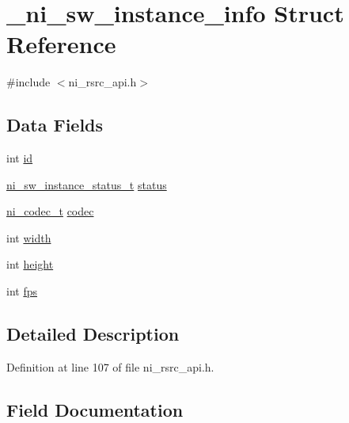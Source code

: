 \hypertarget{struct__ni__sw__instance__info}{}\section{\+\_\+ni\+\_\+sw\+\_\+instance\+\_\+info Struct Reference}
\label{struct__ni__sw__instance__info}


{\ttfamily \#include $<$ni\+\_\+rsrc\+\_\+api.\+h$>$}

\subsection*{Data Fields}
\begin{DoxyCompactItemize}
\item 
int \mbox{\hyperlink{struct__ni__sw__instance__info_a7441ef0865bcb3db9b8064dd7375c1ea}{id}}
\item 
\mbox{\hyperlink{ni__rsrc__api_8h_a64a7b6cabb90ef404ab5425542fefe20}{ni\+\_\+sw\+\_\+instance\+\_\+status\+\_\+t}} \mbox{\hyperlink{struct__ni__sw__instance__info_a1edc0e5686dc061d581baf18b9afcefd}{status}}
\item 
\mbox{\hyperlink{ni__rsrc__api_8h_a9945b3a5098e949d3e596e6f778e01bc}{ni\+\_\+codec\+\_\+t}} \mbox{\hyperlink{struct__ni__sw__instance__info_a5d523c13e7580783149de7a0685c2f0b}{codec}}
\item 
int \mbox{\hyperlink{struct__ni__sw__instance__info_a2474a5474cbff19523a51eb1de01cda4}{width}}
\item 
int \mbox{\hyperlink{struct__ni__sw__instance__info_ad12fc34ce789bce6c8a05d8a17138534}{height}}
\item 
int \mbox{\hyperlink{struct__ni__sw__instance__info_a45b67662d620a977a2cfe519f7ab6273}{fps}}
\end{DoxyCompactItemize}


\subsection{Detailed Description}


Definition at line 107 of file ni\+\_\+rsrc\+\_\+api.\+h.



\subsection{Field Documentation}
\mbox{\label{struct__ni__sw__instance__info_a5d523c13e7580783149de7a0685c2f0b}} 
